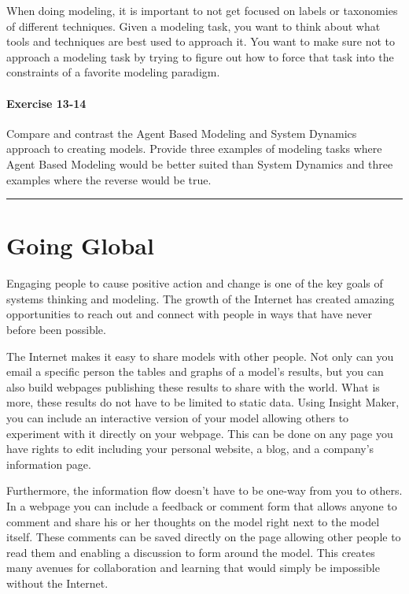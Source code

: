 \documentclass[]{memoir}
\begin{document}
When doing modeling, it is important to not get focused on labels or
taxonomies of different techniques. Given a modeling task, you want to
think about what tools and techniques are best used to approach it. You
want to make sure not to approach a modeling task by trying to figure
out how to force that task into the constraints of a favorite modeling
paradigm.

\subsubsection{Exercise 13-14}

Compare and contrast the Agent Based Modeling and System Dynamics
approach to creating models. Provide three examples of modeling tasks
where Agent Based Modeling would be better suited than System Dynamics
and three examples where the reverse would be true.

\begin{center}\rule{3in}{0.4pt}\end{center}

\chapter{Going Global}

Engaging people to cause positive action and change is one of the key
goals of systems thinking and modeling. The growth of the Internet has
created amazing opportunities to reach out and connect with people in
ways that have never before been possible.

The Internet makes it easy to share models with other people. Not only
can you email a specific person the tables and graphs of a model's
results, but you can also build webpages publishing these results to
share with the world. What is more, these results do not have to be
limited to static data. Using Insight Maker, you can include an
interactive version of your model allowing others to experiment with it
directly on your webpage. This can be done on any page you have rights
to edit including your personal website, a blog, and a company's
information page.

Furthermore, the information flow doesn't have to be one-way from you to
others. In a webpage you can include a feedback or comment form that
allows anyone to comment and share his or her thoughts on the model
right next to the model itself. These comments can be saved directly on
the page allowing other people to read them and enabling a discussion to
form around the model. This creates many avenues for collaboration and
learning that would simply be impossible without the Internet.
\end{document}
